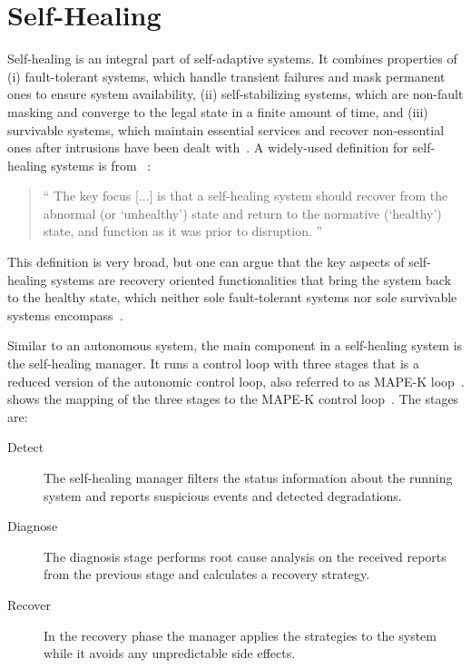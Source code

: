 
\section{Self-Healing}\label{sec:self-healing}
  Self-healing is an integral part of self-adaptive systems.
  It combines properties of
  (i) fault-tolerant systems, which handle transient failures and mask permanent ones to ensure system availability,
  (ii) self-stabilizing systems, which are non-fault masking and converge to the legal state in a finite amount of time, and 
  (iii) survivable systems, which maintain essential services and recover non-essential ones after intrusions have been dealt with~\cite{PsaierSurvey}.
  A widely-used definition for self-healing systems is from \citeauthor{Ghosh}~\cite{Ghosh}:

  \begin{quote}
    \enquote{%
    The key focus [...] is that a self-healing system should recover from the abnormal (or \enquote{unhealthy}) state and return to the normative (\enquote{healthy}) state, and function as it was prior to disruption.%
    }
  \end{quote}

  This definition is very broad, but one can argue that the key aspects of self-healing systems are recovery oriented functionalities that bring the system back to the healthy state, which neither sole fault-tolerant systems nor sole survivable systems encompass~\cite{PsaierSurvey}.

  Similar to an autonomous system, the main component in a self-healing system is the self-healing manager.
  It runs a control loop with three stages that is a reduced version of the autonomic control loop, also referred to as MAPE-K loop~\cite{ibm_autonomic}.
   shows the mapping of the three stages to the MAPE-K control loop~\cite{PsaierSurvey}.
  The stages are:

  \begin{description}
    \item[Detect] The self-healing manager filters the status information about the running system and reports suspicious events and detected degradations.
    \item[Diagnose] The diagnosis stage performs root cause analysis on the received reports from the previous stage and calculates a recovery strategy.
    \item[Recover] In the recovery phase the manager applies the strategies to the system while it avoids any unpredictable side effects.
  \end{description}

